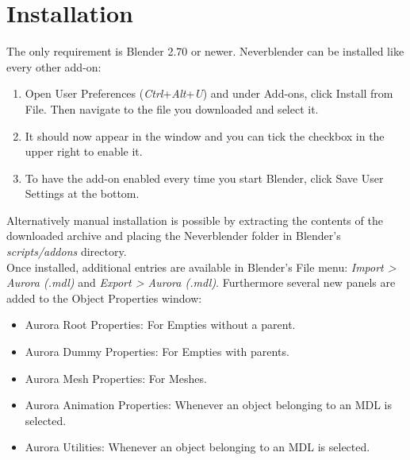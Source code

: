 \chapter{Installation}
The only requirement is Blender 2.70 or newer. Neverblender can be installed
like every other add-on: 
\begin{enumerate}
\item Open User Preferences (\textit{Ctrl}+\textit{Alt}+\textit{U}) and under Add-ons, 
click Install from File. Then navigate to the file you downloaded and select it.
\item It should now appear in the window and you can tick the checkbox in the upper right to enable it.
\item To have the add-on enabled every time you start Blender, click Save User Settings at the bottom.
\end{enumerate}

Alternatively manual installation is possible by extracting the contents of the
downloaded archive and placing the Neverblender folder in Blender's \textit{scripts/addons} directory.\\

Once installed, additional entries are available in Blender's File menu: \textit{Import > Aurora (.mdl)} and 
\textit{Export > Aurora (.mdl)}. Furthermore several new panels are added to the Object Properties window:
\begin{itemize}
\item Aurora Root Properties: For Empties without a parent.
\item Aurora Dummy Properties: For Empties with parents.
\item Aurora Mesh Properties: For Meshes.
\item Aurora Animation Properties: Whenever an object belonging to an MDL is selected.
\item Aurora Utilities: Whenever an object belonging to an MDL is selected.
\end{itemize}